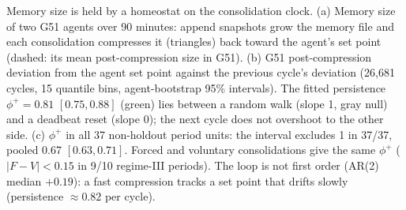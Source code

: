 \caption{Memory size is held by a homeostat on the consolidation clock.
(a) Memory size of two G51 agents over 90 minutes: append snapshots grow the memory file and each consolidation compresses it (triangles) back toward the agent's set point (dashed: its mean post-compression size in G51).
(b) G51 post-compression deviation from the agent set point against the previous cycle's deviation (26{,}681 cycles, 15 quantile bins, agent-bootstrap 95\% intervals). The fitted persistence $\phi^+ = 0.81$ $[0.75, 0.88]$ (green) lies between a random walk (slope 1, gray null) and a deadbeat reset (slope 0); the next cycle does not overshoot to the other side.
(c) $\phi^+$ in all 37 non-holdout period units: the interval excludes 1 in 37/37, pooled 0.67 $[0.63, 0.71]$. Forced and voluntary consolidations give the same $\phi^+$ ($|F-V|<0.15$ in 9/10 regime-III periods). The loop is not first order (AR(2) median $+0.19$): a fast compression tracks a set point that drifts slowly (persistence $\approx 0.82$ per cycle).}
\label{fig:H71}
